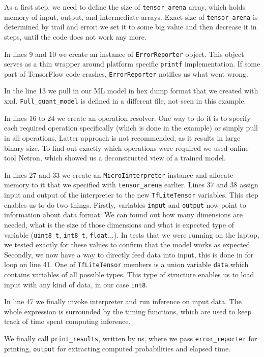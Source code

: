 \clearpage
As a first step, we need to define the size of \verb|tensor_arena| array, which holds memory of input, output, and intermediate arrays.
Exact size of \verb|tensor_arena| is determined by trail and error: we set it to some big value and then decrease it in steps, until the code does not work any more.

In lines 9 and 10 we create an instance of \verb|ErrorReporter| object.
This object serves as a thin wrapper around platform specific \verb|printf| implementation.
If some part of TensorFlow code crashes, \verb|ErrorReporter| notifies us what went wrong.

In the line 13 we pull in our ML model in hex dump format that we created with xxd.
\verb|Full_quant_model| is defined in a different file, not seen in this example.

In lines 16 to 24 we create an operation resolver.
One way to do it is to specify each required operation specifically (which is done in the example) or simply pull in all operations.
Latter approach is not recommended, as it results in large binary size.
To find out exactly which operations were required we used online tool Netron\cite{netron}, which showed us a deconstructed view of a trained model.

In lines 27 and 33 we create an \verb|MicroIinterpreter| instance and allocate memory to it that we specified with \verb|tensor_arena| earlier.
Lines 37 and 38 assign input and output of the interpreter to the new \verb|TfLiteTensor| variables.
This step enables us to do two things.
Firstly, variables \verb|input| and \verb|output| now point to information about data format: We can found out how many dimensions are needed, what is the size of those dimensions and what is expected type of variable (\verb|uint8_t|, \verb|int8_t|, \verb|float|...).
In tests that we were running on the laptop, we tested exactly for these values to confirm that the model works as expected.
Secondly, we now have a way to directly feed data into input, this is done in for loop on line 41.
One of \verb|TfLiteTensor| members is a union variable \verb|data| which contains variables of all possible types.
This type of structure enables us to load input with any kind of data, in our case \verb|int8|.

In line 47 we finally invoke interpreter and run inference on input data.
The whole expression is surrounded by the timing functions, which are used to keep track of time spent computing inference.

We finally call \verb|print_results|, written by us, where we pass \verb|error_reporter| for printing, \verb|output| for extracting computed probabilities and elapsed time.

